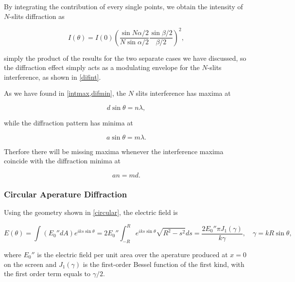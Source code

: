 \documentclass[english,a4paper,12pt]{report}
\begin{document}
By integrating the contribution of every single points, we obtain the intensity of \(N\)-slits diffraction as 

\begin{equation}
    I(\theta ) = I(0) \left(\frac{\sin N \alpha /2}{N \sin \alpha /2}  \frac{\sin \beta /2}{\beta /2}   \right)^2,
\end{equation}

simply the product of the results for the two separate cases we have discussed, so the diffraction effect simply acts as a modulating envelope for the \(N\)-slits interference, as shown in \cref{difint}.

As we have found in \cref{intmax,difmin}, the \(N\) slits interference has maxima at 

\begin{equation}
    d \sin \theta = n \lambda ,
\end{equation}

while the diffraction pattern has minima at 

\begin{equation}
    a \sin \theta = m \lambda .
\end{equation}

Therfore there will be missing maxima whenever the interference maxima coincide with the diffraction minima at 

\begin{equation}
    an = md.
\end{equation}






\subsubsection{Circular Aperature Diffraction}

Using the geometry shown in \cref{circular}, the electric field is 

\begin{equation}
    E(\theta ) = \int_{}^{} (E_0 ''dA) e^{iks \sin \theta } = 2E_0 '' \int_{-R}^{R} e^{iks \sin \theta }\sqrt{R^2-s ^2}ds = \frac{2E_0 ''\pi J_1 (\gamma )}{k\gamma }, \quad \gamma = kR\sin \theta ,
\end{equation}

where \(E_0 ''\) is the electric field per unit area over the aperature produced at \(x = 0\) on the screen and \(J_1 (\gamma )\) is the first-order Bessel function of the first kind, with the first order term equals to \(\gamma /2\).  
\end{document}
